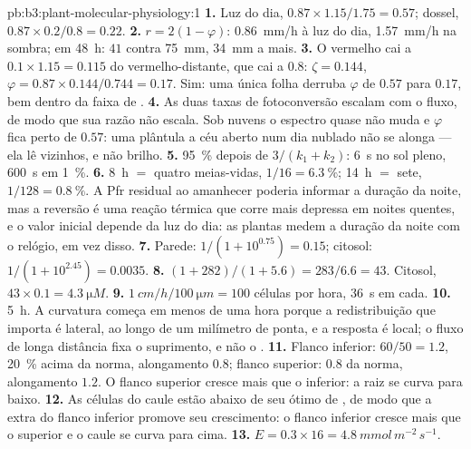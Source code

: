 \begin{solution}{pb:b3:plant-molecular-physiology:1}
\textbf{1.} Luz do dia, $0.87\times 1.15/1.75 = 0.57$; dossel,
$0.87\times
0.2/0.8 = 0.22$.
\textbf{2.} $r = 2(1 - \varphi)$: \qty{0.86}{mm/h} à luz do dia,
\qty{1.57}{mm/h} na sombra; em \qty{48}{h}: $41$ contra \qty{75}{mm},
\qty{34}{mm} a mais.
\textbf{3.} O vermelho cai a $0.1\times 1.15 = 0.115$ do
vermelho-distante, que cai a $0.8$: $\zeta = 0.144$, $\varphi = 0.87\times 0.144/0.744 =
0.17$. Sim: uma única folha derruba $\varphi$ de
$0.57$ para $0.17$, bem dentro da faixa de .
\textbf{4.} As duas taxas de fotoconversão escalam com o fluxo, de modo
que sua razão não escala. Sob nuvens o espectro quase não muda e
$\varphi$ fica perto de $0.57$: uma plântula a céu aberto num dia
nublado não se alonga --- ela lê vizinhos, e não brilho.
\textbf{5.} \qty{95}{\%} depois de $3/(k_{1} + k_{2})$: \qty{6}{s} no sol
pleno, \qty{600}{s} em \qty{1}{\%}.
\textbf{6.} \qty{8}{h} $=$ quatro meias-vidas, $1/16 = \qty{6.3}{\%}$;
\qty{14}{h} $=$ sete, $1/128 = \qty{0.8}{\%}$. A Pfr residual ao
amanhecer poderia informar a duração da noite, mas a reversão é uma
reação térmica que corre mais depressa em noites quentes, e o valor
inicial depende da luz do dia: as plantas medem a duração da noite com o
relógio, em vez disso.
\textbf{7.} Parede: $1/(1 + 10^{0.75}) = 0.15$; citosol: $1/(1 +
10^{2.45}) = 0.0035$.
\textbf{8.} $(1 + 282)/(1 + 5.6) = 283/6.6 = 43$. Citosol,
$43\times 0.1 = \qty{4.3}{\micro M}$.
\textbf{9.} $\qty{1}{cm/h}/\qty{100}{\micro m} = 100$ células por hora,
\qty{36}{s} em cada.
\textbf{10.} \qty{5}{h}. A curvatura começa em menos de uma hora porque a
redistribuição que importa é lateral, ao longo de um milímetro de ponta,
e a resposta é local; o fluxo de longa distância fixa o suprimento, e não
o .
\textbf{11.} Flanco inferior: $60/50 = 1.2$,  \qty{20}{\%} acima da
norma, alongamento $0.8$; flanco superior: $0.8$ da norma, alongamento
$1.2$. O flanco superior cresce mais que o inferior: a raiz se curva para
baixo.
\textbf{12.} As células do caule estão abaixo de seu ótimo de , de
modo que a  extra do flanco inferior promove seu crescimento: o
flanco inferior cresce mais que o superior e o caule se curva para cima.
\textbf{13.} $E = 0.3\times 16 = \qty{4.8}{mmol\,m^{-2}\,s^{-1}}$.

\end{solution}
